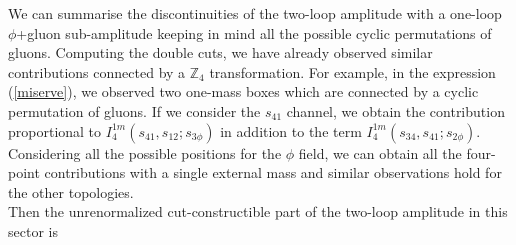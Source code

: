 We can summarise the discontinuities of the two-loop amplitude with a one-loop $\phi$+gluon sub-amplitude keeping in mind all the possible cyclic permutations of gluons. Computing the double cuts, we have already observed similar contributions connected by a $\mathbb{Z}_4$ transformation. For example, in the expression (\ref{miserve}), we observed two one-mass boxes which are connected by a cyclic permutation of gluons. If we consider the $s_{41}$ channel, we obtain the contribution proportional to $I_4^{1m}(s_{41},s_{12};s_{3\phi})$ in addition to the term $I_4^{1m}(s_{34},s_{41};s_{2\phi})$. Considering all the possible positions for the $\phi$ field, we can obtain all the four-point contributions with a single external mass and similar observations hold for the other topologies.\\
Then the unrenormalized cut-constructible part of the two-loop amplitude in this sector is 
